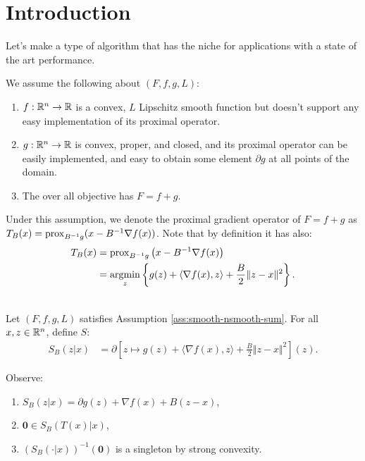 \documentclass[12pt]{article}
\begin{document}
\section{Introduction}
    Let's make a type of algorithm that has the niche for applications with a state of the art performance. 
    \begin{assumption}\label{ass:smooth-nsmooth-sum}
        We assume the following about $(F, f, g, L)$: 
        \begin{enumerate}[nosep]
            \item $f: \mathbb R^n \rightarrow \mathbb R$ is a convex, $L$ Lipschitz smooth function but doesn't support any easy implementation of its proximal operator. 
            \item $g: \mathbb R^n \rightarrow \mathbb R$ is convex, proper, and closed, and its proximal operator can be easily implemented, and easy to obtain some element $\partial g$ at all points of the domain. 
            \item The over all objective has $F = f + g$. 
        \end{enumerate}
        Under this assumption, we denote the proximal gradient operator of $F = f+ g$ as $T_B(x) = \operatorname{prox}_{B^{-1}g}(x - B^{-1}\nabla f(x))$. 
        Note that by definition it has also:
        \begin{align*}
            T_B(x) &= 
            \operatorname{prox}_{B^{-1}g}\left(
                x - B^{-1}\nabla f(x)
            \right)
            \\
            &= \mathop{\rm argmin}\limits_{z}\left\lbrace
                g(z)
                + \langle \nabla f(x), z\rangle
                + \frac{B}{2}\Vert z - x \Vert^2
            \right\rbrace. 
        \end{align*}
    \end{assumption}
    \begin{definition}\;\\
        Let $(F, f, g, L)$ satisfies Assumption \ref{ass:smooth-nsmooth-sum}. 
        For all $x, z \in \mathbb R^n$, define $S$: 
        \begin{align*}
            S_B(z | x) &= \partial 
            \left[
                z \mapsto g(z)
                + \langle \nabla f(x), z\rangle
                + \frac{B}{2}\Vert z - x \Vert^2
            \right](z). 
        \end{align*}
    \end{definition}
    Observe: 
    \begin{enumerate}[nosep]
        \item $S_B(z | x) = \partial g(z) + \nabla f(x)+ B(z - x)$,
        \item $\mathbf 0 \in S_B(T(x) | x)$, 
        \item $(S_B(\cdot | x))^{-1}(\mathbf 0)$ is a singleton by strong convexity. 
    \end{enumerate}
\end{document}
